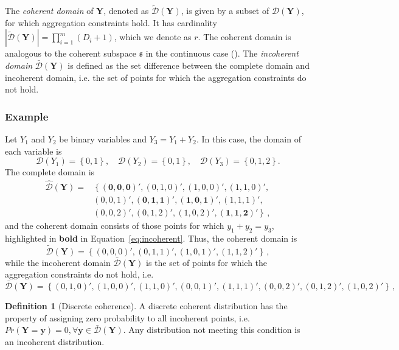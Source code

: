 \documentclass[a4paper,review,11pt,authoryear]{elsarticle}
\newcommand{\bY}{\mathbf{Y}}
\theoremstyle{definition}
\newtheorem{definition}{Definition}[section]
\begin{document}
The \textit{coherent domain} of $\bY$, denoted as $\tilde{\mathcal D}(\bY)$, is given by a subset of $\hat{\mathcal D}(\bY)$, for which aggregation constraints hold.
It has cardinality $|\tilde{\mathcal D}(\bY)|=\prod\limits_{i=1}^{m} (D_i+1)$, which we denote as $r$.
The coherent domain is analogous to the coherent subspace $\mathfrak{s}$ in the continuous case (\citealp{panagiotelisProbabilisticForecastReconciliation2022}). The \textit{incoherent domain} $\bar{\mathcal D}(\bY)$ is defined as the set difference between the complete domain and incoherent domain, i.e. the set of points for which the aggregation constraints do not hold.

  \subsubsection*{\textbf{Example}}
  \label{sec:example}

  Let $Y_1$ and $Y_2$ be binary variables and $Y_3=Y_1+Y_2$. In this case, the domain of each variable is
  \[
    \mathcal{D}(Y_1)=\left\{0,1\right\},\quad
    \mathcal{D}(Y_2)=\left\{0,1\right\},\quad
    \mathcal{D}(Y_3)=\left\{0,1,2\right\}.
  \]
  The complete domain is
  \begin{equation}
  \begin{aligned}
  \hat{\mathcal D}(\bY)=&\left\{\mathbf{(0,0,0)'},(0,1,0)',(1,0,0)',(1,1,0)',\right.\\
  &\left.(0,0,1)',\mathbf{(0,1,1)'},\mathbf{(1,0,1)'},(1,1,1)',\right.\\
  &\left.(0,0,2)',(0,1,2)',(1,0,2)',\mathbf{(1,1,2)'}\right\}\,,
  \end{aligned}
  \label{eq:incoherent}
  \end{equation}
  and the coherent domain consists of those points for which $y_1+y_2=y_3$, highlighted in \textbf{bold} in Equation~\eqref{eq:incoherent}. Thus, the coherent domain is
  \[
      \tilde{\mathcal D}(\bY)=\left\{(0,0,0)',(0,1,1)',(1,0,1)',(1,1,2)'\right\}\,,
  \]
  while the incoherent domain $\bar{\mathcal D}(\bY)$ is the set of points for which the aggregation constraints do not hold, i.e.
    \[
  \bar{\mathcal D}(\bY)=\left\{(0,1,0)',(1,0,0)',(1,1,0)',(0,0,1)',
  (1,1,1)',(0,0,2)',(0,1,2)',(1,0,2)'
  \right\}\,,
  \]
  
  \begin{definition}[Discrete coherence]
  
  A discrete coherent distribution has the property of assigning zero probability to all incoherent points, i.e. $Pr(\mathbf{Y}=\bm{y})=0, \forall \bm{y}\in \bar{\mathcal D}(\bY)$. Any distribution not meeting this condition is an incoherent distribution.

  \end{definition}
\end{document}
